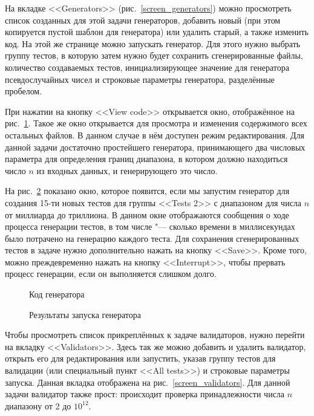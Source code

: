 На вкладке <<Generators>> (рис.~\ref{screen_generators}) можно просмотреть список созданных для этой задачи генераторов, добавить новый (при этом копируется пустой шаблон для генератора) или удалить старый, а также изменить код. На этой же странице можно запускать генератор. Для этого нужно выбрать группу тестов, в которую затем нужно будет сохранить сгенерированные файлы, количество создаваемых тестов, инициализирующее значение для генератора псевдослучайных чисел и строковые параметры генератора, разделённые пробелом.

При нажатии на кнопку <<View code>> открывается окно, отображённое на рис.~\ref{screen_generator_code}. Такое же окно открывается для просмотра и изменения содержимого всех остальных файлов. В данном случае в нём доступен режим редактирования. Для данной задачи достаточно простейшего генератора, принимающего два числовых параметра для определения границ диапазона, в котором должно находиться число $n$ из входных данных, и генерирующего это число.

На рис.~\ref{screen_generator_result} показано окно, которое появится, если мы запустим генератор для создания 15-ти новых тестов для группы <<Tests 2>> с диапазоном для числа $n$ от миллиарда до триллиона. В данном окне отображаются сообщения о ходе процесса генерации тестов, в том числе "--- сколько времени в миллисекундах было потрачено на генерацию каждого теста. Для сохранения сгенерированных тестов в задаче нужно дополнительно нажать на кнопку <<Save>>. Кроме того, можно преждевременно нажать на кнопку <<Interrupt>>, чтобы прервать процесс генерации, если он выполняется слишком долго.

\begin{figure}[!p]
\caption{Код генератора}
\label{screen_generator_code}
\end{figure}

\begin{figure}[!p]
\caption{Результаты запуска генератора}
\label{screen_generator_result}
\end{figure}

Чтобы просмотреть список прикреплённых к задаче валидаторов, нужно перейти на вкладку <<Validators>>. Здесь так же можно добавить и удалить валидатор, открыть его для редактирования или запустить, указав группу тестов для валидации (или специальный пункт <<All tests>>) и строковые параметры запуска. Данная вкладка отображена на рис.~\ref{screen_validators}. Для данной задачи валидатор также прост: происходит проверка принадлежности числа $n$ диапазону от 2 до $10^{12}$.

